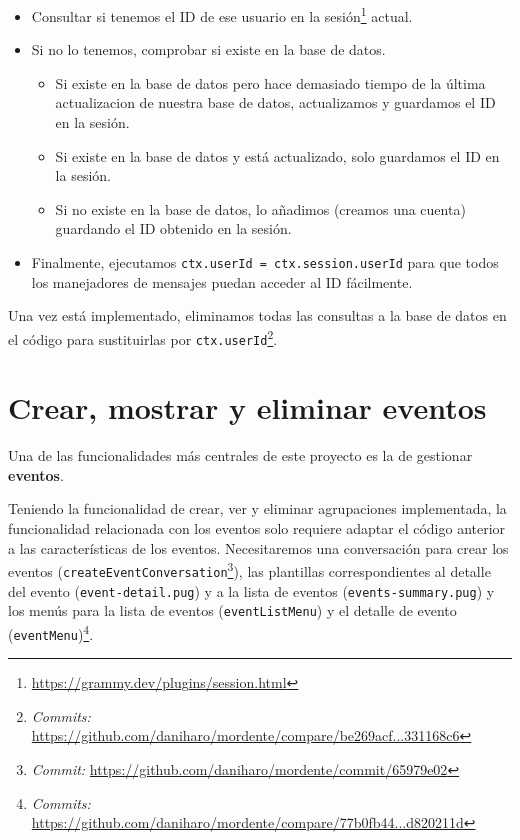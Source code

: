 \begin{itemize}
    \item Consultar si tenemos el ID de ese usuario en la sesión\footnote{\url{https://grammy.dev/plugins/session.html}} actual.
    \item Si no lo tenemos, comprobar si existe en la base de datos.
    \begin{itemize}
        \item Si existe en la base de datos pero hace demasiado tiempo de la última actualizacion de nuestra base de datos, actualizamos y guardamos el ID en la sesión.
        \item Si existe en la base de datos y está actualizado, solo guardamos el ID en la sesión.
        \item Si no existe en la base de datos, lo añadimos (creamos una cuenta) guardando el ID obtenido en la sesión.
    \end{itemize}
    \item Finalmente, ejecutamos \texttt{ctx.userId = ctx.session.userId} para que todos los manejadores de mensajes puedan acceder al ID fácilmente.
\end{itemize}


Una vez está implementado, eliminamos todas las consultas a la base de datos en el código para sustituirlas por \texttt{ctx.userId}\footnote{\textit{Commits:} \url{https://github.com/daniharo/mordente/compare/be269acf...331168c6}}.

\section{Crear, mostrar y eliminar eventos}

Una de las funcionalidades más centrales de este proyecto es la de gestionar \textbf{eventos}.

Teniendo la funcionalidad de crear, ver y eliminar agrupaciones implementada, la funcionalidad relacionada con los eventos solo requiere adaptar el código anterior a las características de los eventos. Necesitaremos una conversación para crear los eventos (\texttt{createEventConversation}\footnote{\textit{Commit:} \url{https://github.com/daniharo/mordente/commit/65979e02}}), las plantillas correspondientes al detalle del evento (\texttt{event-detail.pug}) y a la lista de eventos (\texttt{events-summary.pug}) y los menús para la lista de eventos (\texttt{eventListMenu}) y el detalle de evento (\texttt{eventMenu})\footnote{\textit{Commits:} \url{https://github.com/daniharo/mordente/compare/77b0fb44...d820211d}}.



